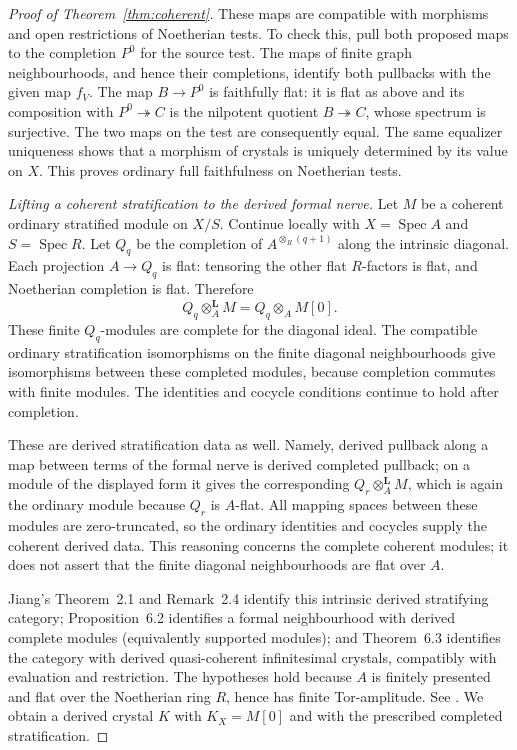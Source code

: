 \documentclass[11pt]{article}
\DeclareMathOperator{\Spec}{Spec}\DeclareMathOperator{\Hom}{Hom}
\theoremstyle{definition}\newtheorem{definition}[theorem]{Definition}
\theoremstyle{remark}\newtheorem{remark}[theorem]{Remark}
\begin{document}
\begin{proof}[Proof of Theorem~\ref{thm:coherent}]
These maps are compatible with morphisms and open restrictions of Noetherian tests.  To check this, pull both proposed maps to the completion $P^0$ for the source test.  The maps of finite graph neighbourhoods, and hence their completions, identify both pullbacks with the given map $f_V$.  The map $B\to P^0$ is faithfully flat: it is flat as above and its composition with $P^0\twoheadrightarrow C$ is the nilpotent quotient $B\twoheadrightarrow C$, whose spectrum is surjective.  The two maps on the test are consequently equal.  The same equalizer uniqueness shows that a morphism of crystals is uniquely determined by its value on $X$.  This proves ordinary full faithfulness on Noetherian tests.

\emph{Lifting a coherent stratification to the derived formal nerve.}
Let $M$ be a coherent ordinary stratified module on $X/S$.  Continue locally with $X=\Spec A$ and $S=\Spec R$.  Let $Q_q$ be the completion of $A^{\otimes_R(q+1)}$ along the intrinsic diagonal.  Each projection $A\to Q_q$ is flat: tensoring the other flat $R$-factors is flat, and Noetherian completion is flat.  Therefore
\[
                    Q_q\otimes_A^{\mathbf L}M=Q_q\otimes_AM[0].
\]
These finite $Q_q$-modules are complete for the diagonal ideal.  The compatible ordinary stratification isomorphisms on the finite diagonal neighbourhoods give isomorphisms between these completed modules, because completion commutes with finite modules.  The identities and cocycle conditions continue to hold after completion.

These are derived stratification data as well.  Namely, derived pullback along a map between terms of the formal nerve is derived completed pullback; on a module of the displayed form it gives the corresponding $Q_r\otimes_A^{\mathbf L}M$, which is again the ordinary module because $Q_r$ is $A$-flat.  All mapping spaces between these modules are zero-truncated, so the ordinary identities and cocycles supply the coherent derived data.  This reasoning concerns the complete coherent modules; it does not assert that the finite diagonal neighbourhoods are flat over $A$.

Jiang's Theorem~2.1 and Remark~2.4 identify this intrinsic derived stratifying category; Proposition~6.2 identifies a formal neighbourhood with derived complete modules (equivalently supported modules); and Theorem~6.3 identifies the category with derived quasi-coherent infinitesimal crystals, compatibly with evaluation and restriction.  The hypotheses hold because $A$ is finitely presented and flat over the Noetherian ring $R$, hence has finite Tor-amplitude.  See \citet[pp.~16--17, 32--34; also Theorem~B.5, pp.~43--45]{Jiang}.  We obtain a derived crystal $K$ with $K_X=M[0]$ and with the prescribed completed stratification.


\end{proof}
\end{document}
